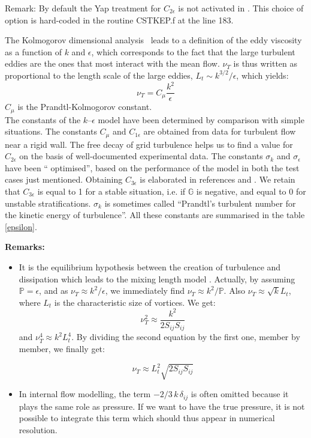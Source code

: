 \begin{CommentBlock}{Remark:}
By default the Yap treatment for $C_{2\epsilon}$ is not activated in .
This choice of option is hard-coded in the routine CSTKEP.f at the line 183.
\end{CommentBlock}

The Kolmogorov dimensional analysis~\cite{Kolmogorov1991} leads to a definition of the eddy viscosity as a function of $k$ and $\epsilon$,
which corresponds to the fact that the large turbulent eddies are the ones that most interact with the mean flow.
$\nu_T$ is thus written as proportional to the length scale of the large eddies, $L_t \sim k^{3/2}/\epsilon$, which yields:
\begin{equation}\label{eq:nut}
\nu_T = C_\mu \dfrac{k^2}{\epsilon}
\end{equation}
$C_\mu$ is the Prandtl-Kolmogorov constant.\\

The constants of the $k$--$\epsilon$ model have been determined by
comparison with simple situations. The constants $C_{\mu}$ and
$C_{1\epsilon}$ are obtained from data for turbulent flow near a rigid
wall. The free decay of grid turbulence helps us to find a value for
$C_{2\epsilon}$ on the basis of well-documented experimental data. The
constants $\sigma_{k}$ and $\sigma_{\epsilon}$ have been \textquotedblleft
optimised\textquotedblright, based on the performance of the model in both the
test cases just mentioned. Obtaining $C_{3\epsilon} $ is elaborated in
references \cite{launder74} and \cite{Viollet2002}. We retain that
$C_{3\epsilon}$ is equal to 1 for a stable situation, i.e. if $\mathbb G$ is
negative, and equal to 0 for unstable stratifications. $\sigma_{k}$ is
sometimes called \textquotedblleft Prandtl's turbulent number for the kinetic
energy of turbulence\textquotedblright.
All these constants are summarised in the table \ref{epsilon}.%

\textbf{Remarks:}
\begin{itemize}
\item {It is the equilibrium hypothesis between the creation of turbulence and
dissipation which leads to the mixing length model%
%
. Actually, by assuming $\mathbb P=\epsilon$, and as $\nu_T\approx k^{2}/\epsilon$,
we immediately find $\nu_T\approx k^{2}/\mathbb P$. Also
$\nu_T\approx\sqrt{k}L_{t}$, where $L_{t}$ is the characteristic size of
vortices. We get:
\[\nu_T^{2}\approx\dfrac{k^{2}}{2S_{ij}S_{ij}}\]
and $\nu_T^{4}\approx k^{2}L_{t}^{4}$. By dividing the second equation by
the first one, member by member, we finally get:%

\[\nu_T\approx L_{t}^{2}\sqrt{2S_{ij}S_{ij}}\]
}
\item{In internal flow modelling, the term $-2/3 \, k\,\delta_{ij}$ is often
omitted because it plays the same role as pressure. If we want to have the
true pressure, it is not possible to integrate this term which should thus
appear in numerical resolution.
}
\end{itemize}

